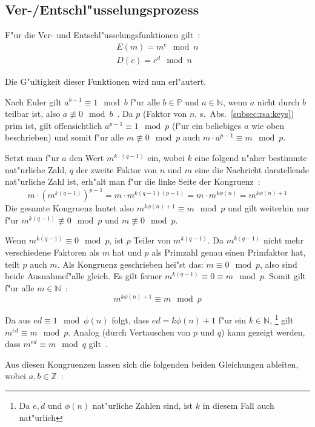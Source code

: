 \documentclass[12pt]{article}
\begin{document}
\subsection{Ver-/Entschl"usselungsprozess}
F"ur die Ver- und Entschl"usselungsfunktionen gilt~\cite{rsa}:
\[
\begin{aligned}
E(m) = m^e \mod n \\
D(c) = c^d \mod n
\end{aligned}
\]

\noindent
Die G"ultigkeit dieser Funktionen wird nun erl"autert.

Nach Euler gilt $a^{b-1} \equiv 1 \mod b$ f"ur alle $b \in \mathbb{P}$ und $a \in \mathbb{N}$,
wenn $a$ nicht durch $b$ teilbar ist, also $a \not\equiv 0 \mod b$~\cite{euler41}.
Da $p$ (Faktor von $n$, s.~Abs.~\ref{subsec:rsa:keys}) prim ist,
gilt offensichtlich $a^{p-1} \equiv 1 \mod p$
(f"ur ein beliebiges $a$ wie oben beschrieben) und somit f"ur alle $m \not\equiv 0 \mod p$ auch
$m \cdot a^{p-1} \equiv m \mod p$.

Setzt man f"ur $a$ den Wert $m^{k \cdot (q-1)}$ ein,
wobei $k$ eine folgend n"aher bestimmte nat"urliche Zahl, $q$ der zweite Faktor von $n$
und $m$ eine die Nachricht darstellende nat"urliche Zahl ist,
erh"alt man f"ur die linke Seite der Kongruenz~\cite{rsa}:
\[
    m \cdot \left(m^{k(q-1)}\right)^{p-1} = m \cdot m^{k(q-1)(p-1)} = m \cdot m^{k\phi(n)} = m^{k\phi(n) + 1}
\]
Die gesamte Kongruenz lautet also $m^{k\phi(n)+1} \equiv m \mod p$ und
gilt weiterhin nur f"ur $m^{k(q-1)} \not\equiv 0 \mod p$ und $m \not\equiv 0 \mod p$.

Wenn $m^{k(q-1)} \equiv 0 \mod p$, ist $p$ Teiler von $m^{k(q-1)}$.
Da $m^{k(q-1)}$ nicht mehr verschiedene Faktoren als $m$ hat und $p$ als Primzahl
genau einen Primfaktor hat, teilt $p$ auch $m$.
Als Kongruenz geschrieben hei"st das: $m \equiv 0 \mod p$, also sind beide Ausnahmef"alle gleich.
Es gilt ferner $m^{k(q-1)} \equiv 0 \equiv m \mod p$.
Somit gilt f"ur alle $m \in \mathbb{N}$~\cite{rsa}:
\[m^{k\phi(n)+1} \equiv m \mod p\]

Da aus $ed \equiv 1 \mod \phi(n)$ folgt, dass $ed = k\phi(n) +1$ f"ur ein $k \in \mathbb{N}$,%
\footnote{Da $e, d$ und $\phi(n)$ nat"urliche Zahlen sind, ist $k$ in diesem Fall auch nat"urlich}
gilt $m^{ed} \equiv m \mod p$.
Analog (durch Vertauschen von $p$ und $q$) kann gezeigt werden,
dass $m^{ed} \equiv m \mod q$ gilt~\cite{rsa}.

Aus diesen Kongruenzen lassen sich die folgenden beiden Gleichungen ableiten,
wobei $a, b \in \mathbb{Z}$~\cite{pii1}:
\end{document}
